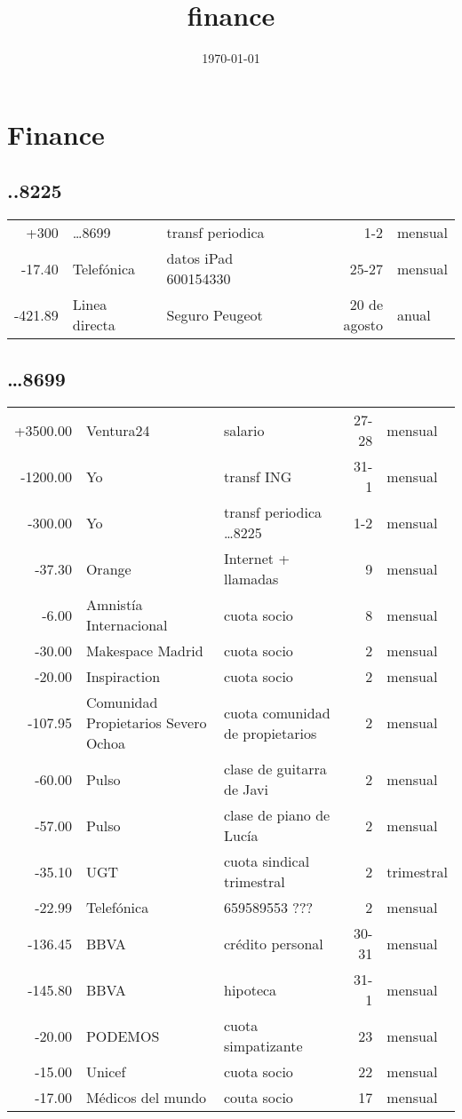 \documentclass[11pt]{article}
\date{\today}
\title{finance}
\begin{document}
\maketitle
\tableofcontents

\section{Finance}
\label{sec-1}
\subsection{..8225}
\label{sec-1-1}
\begin{center}
\begin{tabular}{rllrl}
+300 & \ldots{}8699 & transf periodica & 1-2 & mensual\\
-17.40 & Telefónica & datos iPad 600154330 & 25-27 & mensual\\
-421.89 & Linea directa & Seguro Peugeot & 20 de agosto & anual\\
\end{tabular}
\end{center}
\subsection{\ldots{}8699}
\label{sec-1-2}
\begin{center}
\begin{tabular}{rllrl}
+3500.00 & Ventura24 & salario & 27-28 & mensual\\
-1200.00 & Yo & transf ING & 31-1 & mensual\\
-300.00 & Yo & transf periodica \ldots{}8225 & 1-2 & mensual\\
-37.30 & Orange & Internet + llamadas & 9 & mensual\\
-6.00 & Amnistía Internacional & cuota socio & 8 & mensual\\
-30.00 & Makespace Madrid & cuota socio & 2 & mensual\\
-20.00 & Inspiraction & cuota socio & 2 & mensual\\
-107.95 & Comunidad Propietarios Severo Ochoa & cuota comunidad de propietarios & 2 & mensual\\
-60.00 & Pulso & clase de guitarra de Javi & 2 & mensual\\
-57.00 & Pulso & clase de piano de Lucía & 2 & mensual\\
-35.10 & UGT & cuota sindical trimestral & 2 & trimestral\\
-22.99 & Telefónica & 659589553 ??? & 2 & mensual\\
-136.45 & BBVA & crédito personal & 30-31 & mensual\\
-145.80 & BBVA & hipoteca & 31-1 & mensual\\
-20.00 & PODEMOS & cuota simpatizante & 23 & mensual\\
-15.00 & Unicef & cuota socio & 22 & mensual\\
-17.00 & Médicos del mundo & couta socio & 17 & mensual\\
\end{tabular}
\end{center}
\end{document}
